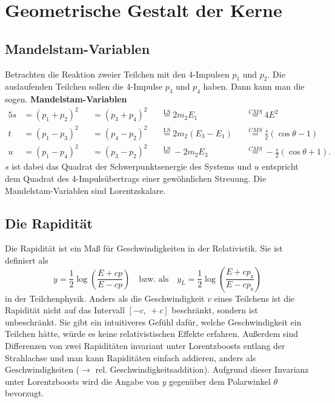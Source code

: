 \chapter{Geometrische Gestalt der Kerne}

\section{Mandelstam-Variablen}
Betrachten die Reaktion zweier Teilchen mit den 4-Impulsen $p_1$ und $p_2$. Die auslaufenden Teilchen sollen die 4-Impulse $p_3$ und $p_4$ haben.
Dann kann man die sogen. \textbf{Mandelstam-Variablen}
\begin{alignat*}{5}
	s &= \left(p_1 + p_2 \right)^2 &&= \left(p_3 + p_4 \right)^2 &&\stackrel{\text{LS}}{=} 2m_2E_1 &&\stackrel{CMS}{=}4E^2\\
	t &= \left(p_1 - p_3 \right)^2 &&= \left(p_4 - p_2 \right)^2 &&\stackrel{\text{LS}}{=} 2m_2(E_3-E_1) &&\stackrel{CMS}{=} \frac{s}{2}(\cos\theta-1)\\
	u &= \left(p_1 - p_4 \right)^2 &&= \left(p_3 - p_2 \right)^2 &&\stackrel{\text{LS}}{=} -2m_2E_3 &&\stackrel{CMS}{=}-\frac{s}{2}(\cos\theta+1).
\end{alignat*}
$s$ ist dabei das Quadrat der Schwerpunktsenergie des Systems und $u$ entspricht dem Quadrat des 4-Impulsübertrags einer gewöhnlichen Streuung.
Die Mandelstam-Variablen sind Lorentzskalare.

\section{Die Rapidität}
Die Rapidität ist ein Maß für Geschwindigkeiten in der Relativistik.
Sie ist definiert als
\begin{equation*}
	y = \frac{1}{2}\log\left(\frac{E+cp}{E-cp}\right)\quad \text{bzw. als}\quad y_L=\frac{1}{2}\log\left(\frac{E+cp_\text{z}}{E-cp_\text{z}}\right)
\end{equation*}
in der Teilchenphysik.
Anders als die Geschwindigkeit $v$ eines Teilchens ist die Rapidität nicht auf das Intervall $[-c,\ +c]$ beschränkt, sondern ist unbeschränkt.
Sie gibt ein intuitiveres Gefühl dafür, welche Geschwindigkeit ein Teilchen hätte, würde es keine relativistischen Effekte erfahren.
Außerdem sind Differenzen von zwei Rapiditäten invariant unter Lorentzboosts entlang der Strahlachse und man kann Rapiditäten einfach addieren, anders als Geschwindigkeiten ($\rightarrow$ rel. Geschwindigkeitsaddition).
Aufgrund dieser Invarianz unter Lorentzboosts wird die Angabe von $y$ gegenüber dem Polarwinkel $\theta$ bevorzugt.

